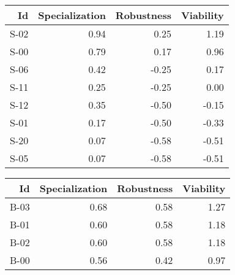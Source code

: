 


\begin{tabular}{ | r | r | r | r | }
    \hline
                    Id  &  Specialization  &      Robustness  &       Viability  \\
    \hline
    \hline
                  S-02  &            0.94  &            0.25  &            1.19  \\
    \hline
                  S-00  &            0.79  &            0.17  &            0.96  \\
    \hline
                  S-06  &            0.42  &           -0.25  &            0.17  \\
    \hline
                  S-11  &            0.25  &           -0.25  &            0.00  \\
    \hline
                  S-12  &            0.35  &           -0.50  &           -0.15  \\
    \hline
                  S-01  &            0.17  &           -0.50  &           -0.33  \\
    \hline
                  S-20  &            0.07  &           -0.58  &           -0.51  \\
    \hline
                  S-05  &            0.07  &           -0.58  &           -0.51  \\
    \hline
\end{tabular}


\begin{tabular}{ | r | r | r | r | }
    \hline
                    Id  &  Specialization  &      Robustness  &       Viability  \\
    \hline
    \hline
                  B-03  &            0.68  &            0.58  &            1.27  \\
    \hline
                  B-01  &            0.60  &            0.58  &            1.18  \\
    \hline
                  B-02  &            0.60  &            0.58  &            1.18  \\
    \hline
                  B-00  &            0.56  &            0.42  &            0.97  \\
    \hline
\end{tabular}


